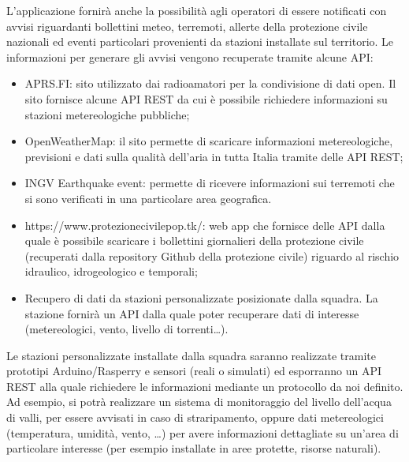 \documentclass[
		a4paper,
		cleardoublepage=empty,
		headings=twolinechapter,
		numbers=autoenddot,
]{article}
\begin{document}
	L’applicazione fornirà anche la possibilità agli operatori di essere notificati con avvisi riguardanti bollettini meteo, terremoti, allerte della protezione civile nazionali ed eventi particolari provenienti da stazioni installate sul territorio. Le informazioni per generare gli avvisi vengono recuperate tramite alcune API: 
	\begin{itemize}
		\item APRS.FI: sito utilizzato dai radioamatori per la condivisione di dati open. Il sito fornisce alcune API REST da cui è possibile richiedere informazioni su stazioni metereologiche pubbliche;
		\item OpenWeatherMap: il sito permette di scaricare informazioni metereologiche, previsioni e dati sulla qualità dell’aria in tutta Italia tramite delle API REST;
		\item INGV Earthquake event: permette di ricevere informazioni sui terremoti che si sono verificati in una particolare area geografica.
		\item https://www.protezionecivilepop.tk/: web app che fornisce delle API dalla quale è possibile scaricare i bollettini giornalieri della protezione civile (recuperati dalla repository Github della protezione civile) riguardo al rischio idraulico, idrogeologico e temporali;
		\item Recupero di dati da stazioni personalizzate posizionate dalla squadra. La stazione fornirà un API dalla quale poter recuperare dati di interesse (metereologici, vento, livello di torrenti…). 
	\end{itemize}

	Le stazioni personalizzate installate dalla squadra saranno realizzate tramite prototipi Arduino/Rasperry e sensori (reali o simulati) ed esporranno un API REST alla quale richiedere le informazioni mediante un protocollo da noi definito. Ad esempio, si potrà realizzare un sistema di monitoraggio del livello dell’acqua di valli, per essere avvisati in caso di straripamento, oppure dati metereologici (temperatura, umidità, vento, …) per avere informazioni dettagliate su un’area di particolare interesse (per esempio installate in aree protette, risorse naturali). 
	
\end{document}
